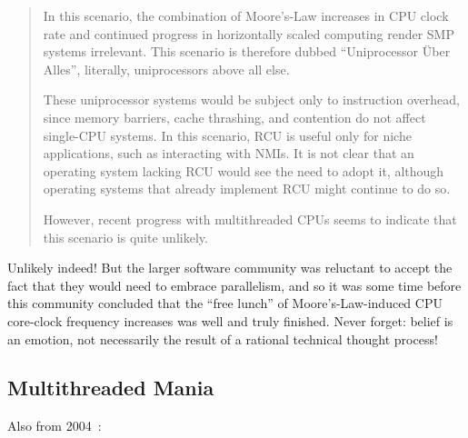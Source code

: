 \begin{quote}
	In this scenario, the combination of Moore's-Law increases in CPU
	clock rate and continued progress in horizontally scaled computing
	render SMP systems irrelevant.
	This scenario is therefore dubbed ``Uniprocessor \"Uber
	Alles'', literally, uniprocessors above all else.

	These uniprocessor systems would be subject only to instruction
	overhead, since memory barriers, cache thrashing, and contention
	do not affect single-CPU systems.
	In this scenario, RCU is useful only for niche applications, such
	as interacting with NMIs.
	It is not clear that an operating system lacking RCU would see
	the need to adopt it, although operating
	systems that already implement RCU might continue to do so.

	However, recent progress with multithreaded CPUs seems to indicate
	that this scenario is quite unlikely.
\end{quote}

Unlikely indeed!
But the larger software community was reluctant to accept the fact that
they would need to embrace parallelism, and so it was some time before
this community concluded that the ``free lunch'' of Moore's-Law-induced
CPU core-clock frequency increases was well and truly finished.
Never forget: belief is an emotion, not necessarily the result of a
rational technical thought process!

\subsection{Multithreaded Mania}
\label{sec:future:Multithreaded Mania}

Also from 2004~\cite{PaulEdwardMcKenneyPhD}:

